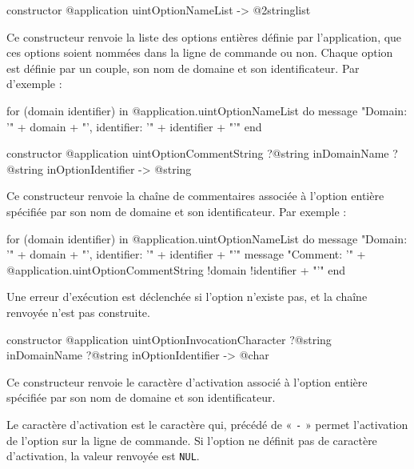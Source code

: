 
\begin{galgas4box}
constructor @application uintOptionNameList -> @2stringlist
\end{galgas4box}

Ce constructeur renvoie la liste des options entières définie par l'application, que ces options soient nommées dans la ligne de commande ou non. Chaque option est définie par un couple, son nom de domaine et son identificateur. Par d'exemple :
\begin{galgas4}
for (domain identifier) in @application.uintOptionNameList do
  message "Domain: '" + domain + "', identifier: '" + identifier + "'\n"
end
\end{galgas4}



\begin{galgas4box}
constructor @application uintOptionCommentString
    ?@string inDomainName
    ?@string inOptionIdentifier -> @string
\end{galgas4box}

Ce constructeur renvoie la chaîne de commentaires associée à l'option entière spécifiée par son nom de domaine et son identificateur. Par exemple :
\begin{galgas4}
for (domain identifier) in @application.uintOptionNameList do
  message "Domain: '" + domain + "', identifier: '" + identifier + "'\n"
  message "Comment: '"
    + @application.uintOptionCommentString {!domain !identifier} + "'\n"
end
\end{galgas4}

Une erreur d'exécution est déclenchée si l'option n'existe pas, et la chaîne renvoyée n'est pas construite.



\begin{galgas4box}
constructor @application uintOptionInvocationCharacter
    ?@string inDomainName
    ?@string inOptionIdentifier -> @char
\end{galgas4box}

Ce constructeur renvoie le caractère d'activation associé à l'option entière spécifiée par son nom de domaine et son identificateur.

Le caractère d'activation est le caractère qui, précédé de « \texttt{-} » permet l'activation de l'option sur la ligne de commande. Si l'option ne définit pas de caractère d'activation, la valeur renvoyée est \texttt{NUL}.

